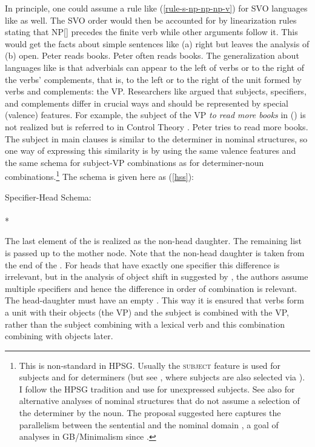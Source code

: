 \documentclass[output=paper,biblatex,babelshorthands,newtxmath,draftmode,colorlinks,citecolor=brown]{langscibook}
\begin{document}
In principle, one could assume a rule like (\ref{rule-s-np-np-np-v}) for SVO languages like 
as well. The SVO order would then be accounted for by linearization rules stating that
NP[] precedes the finite verb while other arguments follow it. This would get the facts
about simple sentences like (a) right but leaves the analysis of (b) open.
\eal
\ex Peter reads books.
\ex Peter often reads books.
\zl
The generalization about languages like  is that adverbials can appear to the left of
verbs or to the right of the verbs' complements, that is, to the left or to the right of the unit
formed by verbs and complements: the VP. Researchers like \citet{Borsley87a} argued that subjects,
specifiers, and complements differ in crucial ways and should be represented by special (valence)
features. For example, the subject of the VP \emph{to read  more books} in () is not realized but is
referred to in Control Theory . 
\ea
Peter tries to read more books.
\z 
The subject in  main clauses is similar to the determiner in nominal structures, so one
way of expressing this similarity is by using the same valence features and the same schema for
subject-VP combinations as for determiner-noun combinations.\footnote{
  This is non-standard in HPSG. Usually the \textsc{subject} feature is used for subjects and \spr
  for determiners (but see , where subjects are also selected via
  \spr). I follow the  HPSG tradition and use \subj for unexpressed subjects. See 
  also  for alternative analyses of nominal structures that do not assume a
  selection of the determiner by the noun. The proposal suggested here captures the parallelism
  between the sentential and the nominal domain \citep{MyPM2021a}, a goal of analyses in
    GB/Minimalism since .%
}
The schema is given here as (\ref{hss}):

\ea
\label{hss}
Specifier-Head Schema:\\
 \impl\\*
\z

\largerpage[2]
\noindent
The last element of the \sprl is realized as the non-head daughter. The remaining list is passed up
to the mother node. 
Note that the non-head daughter is taken from the end of the \sprl. For heads that have exactly one specifier this
difference is irrelevant, but in the analysis of object shift in  suggested by \citet{MOe2013b},
the authors assume multiple specifiers and hence the difference in order of combination is
relevant. The head-daughter must have an empty \compsl. This way it is ensured that verbs form a
unit with their objects (the VP) and the subject is combined with the VP, rather than the subject
combining with a lexical verb and this combination combining with objects later.
\end{document}

